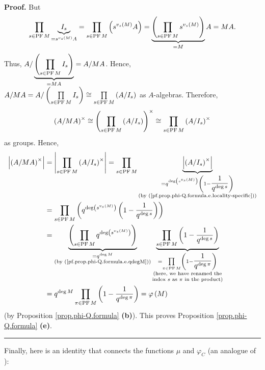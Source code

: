 \documentclass[numbers=enddot,12pt,final,onecolumn,notitlepage]{scrartcl}%
\theoremstyle{definition}
\newenvironment{proof}[1][Proof]{\noindent\textbf{#1.} }{\ \rule{0.5em}{0.5em}}
\let\prodnonlimits\prod
\renewcommand{\prod}{\prodnonlimits\limits}
\begin{document}
\begin{proof}
But
\[
\prod\limits_{s\in\operatorname*{PF}M}\underbrace{I_{s}}_{=s^{v_{s}\left(
M\right)  }A}=\prod\limits_{s\in\operatorname*{PF}M}\left(  s^{v_{s}\left(
M\right)  }A\right)  =\underbrace{\left(  \prod_{s\in\operatorname*{PF}%
M}s^{v_{s}\left(  M\right)  }\right)  }_{=M}A=MA.
\]
Thus, $A/\underbrace{\left(  \prod\limits_{s\in\operatorname*{PF}M}%
I_{s}\right)  }_{=MA}=A/MA$. Hence, $A/MA=A/\left(  \prod\limits_{s\in
\operatorname*{PF}M}I_{s}\right)  \cong\prod\limits_{s\in\operatorname*{PF}%
M}\left(  A/I_{s}\right)  $ as $A$-algebras. Therefore,%
\[
\left(  A/MA\right)  ^{\times}\cong\left(  \prod\limits_{s\in
\operatorname*{PF}M}\left(  A/I_{s}\right)  \right)  ^{\times}\cong%
\prod\limits_{s\in\operatorname*{PF}M}\left(  A/I_{s}\right)  ^{\times}%
\]
as groups. Hence,%
\begin{align*}
\left\vert \left(  A/MA\right)  ^{\times}\right\vert  &  =\left\vert
\prod\limits_{s\in\operatorname*{PF}M}\left(  A/I_{s}\right)  ^{\times
}\right\vert =\prod\limits_{s\in\operatorname*{PF}M}\underbrace{\left\vert
\left(  A/I_{s}\right)  ^{\times}\right\vert }_{\substack{=q^{\deg\left(
s^{v_{s}\left(  M\right)  }\right)  }\left(  1-\dfrac{1}{q^{\deg s}}\right)
\\\text{(by (\ref{pf.prop.phi-Q.formula.e.locality-specific}))}}}\\
&  =\prod\limits_{s\in\operatorname*{PF}M}\left(  q^{\deg\left(
s^{v_{s}\left(  M\right)  }\right)  }\left(  1-\dfrac{1}{q^{\deg s}}\right)
\right) \\
&  =\underbrace{\left(  \prod\limits_{s\in\operatorname*{PF}M}q^{\deg\left(
s^{v_{s}\left(  M\right)  }\right)  }\right)  }_{\substack{=q^{\deg
M}\\\text{(by (\ref{pf.prop.phi-Q.formula.e.qdegM}))}}}\underbrace{\prod
\limits_{s\in\operatorname*{PF}M}\left(  1-\dfrac{1}{q^{\deg s}}\right)
}_{\substack{=\prod\limits_{\pi\in\operatorname*{PF}M}\left(  1-\dfrac
{1}{q^{\deg\pi}}\right)  \\\text{(here, we have renamed the}\\\text{index
}s\text{ as }\pi\text{ in the product)}}}\\
&  =q^{\deg M}\prod\limits_{\pi\in\operatorname*{PF}M}\left(  1-\dfrac
{1}{q^{\deg\pi}}\right)  =\varphi\left(  M\right)
\end{align*}
(by Proposition \ref{prop.phi-Q.formula} \textbf{(b)}). This proves
Proposition \ref{prop.phi-Q.formula} \textbf{(e)}.
\end{proof}

Finally, here is an identity that connects the functions $\mu$ and
$\varphi_{C}$ (an analogue of \cite[(13.84.6)]{reiner-hopf}):
\end{document}
